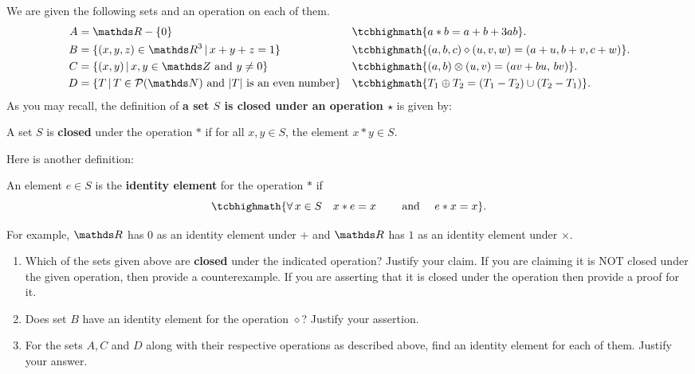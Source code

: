 \documentclass[11pt]{article}
\newcounter{Quesnumb}  %
\newcommand{\problemnum}{%
            \addtocounter{Quesnumb}{1}%
            \arabic{Quesnumb}}
\begin{document}
\begin{problem}{\problemnum}
We are given the following sets and an operation on each of them. 
\begin{align*}
A & =\bbR-\{0\} && \tcbhighmath{a \ast b = a+b+3ab}.\\
B & =\{(x,y,z) \in \bbR^3 \, | \, x+y+z=1\} && \tcbhighmath{(a,b,c) \diamond (u,v,w)=(a+u,b+v,c+w)}.\\
C & =\{(x,y) \, | \, x,y \in \bbZ \text{ and } y \neq 0\} && \tcbhighmath{(a,b) \otimes (u,v)=(av+bu, \, bv)}.\\
D & =\{T \, | \, T \in \power[\bbN] \text{ and } \abs{T} \text{ is an even number}\} && \tcbhighmath{T_1 \oplus T_2=(T_1-T_2) \cup (T_2-T_1)}.
\end{align*}
As you may recall, the definition of \textbf{a set $S$ is closed under an operation $\star$} is given by:
\begin{tcolorbox}[colback=red!10!white, colframe=red!50!blue, title=Closure under an operation, center title]
\begin{define}
A set $S$ is \textbf{closed} under the operation $\ast$ if for all $x,y \in S$, the element $x \ast y \in S$. %
\end{define}
\end{tcolorbox}
Here is another definition:
\begin{tcolorbox}[colback=red!10!white, colframe=red!50!blue, title=Identity element under the operation $\star$, center title]
\begin{define}
An element $e \in S$ is the \textbf{identity element} for the operation $\ast$ if
\[\tcbhighmath{\forall \, x \in S \quad  x \ast e = x \qquad \text{ and } \quad e \ast x = x}. \]
\end{define}
For example, $\bbR$ has $0$ as an identity element under $+$ and $\bbR$ has $1$ as an identity element under $\times$.
\end{tcolorbox}

\begin{enumerate}[label=\alph*).]
\item Which of the sets given above are \textbf{closed} under the indicated operation? Justify your claim. If you are claiming it is NOT closed under the given operation, then provide a counterexample. If you are asserting that it is closed under the operation then provide a proof for it.
\item Does set $B$ have an identity element for the operation $\diamond$? Justify your assertion.
\item For the sets $A,C$ and $D$ along with their respective operations as described above, find an identity element for each of them. Justify your answer.
\end{enumerate}
\end{problem}
\end{document}

